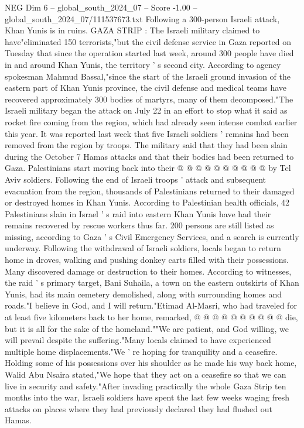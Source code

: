 \begin{textsample}{NEG Dim 6 – global\_south\_2024\_07 – Score -1.00 – global\_south\_2024\_07/111537673.txt}  \label{ex:f6_neg_132}
Following a 300-person Israeli attack, Khan Yunis is in ruins.
GAZA STRIP : The Israeli military claimed to have"eliminated 150 terrorists,"but the civil defense service in Gaza reported on Tuesday that since the operation started last week, around 300 people have died in and around Khan Yunis, the territory ' s second city.
According to agency spokesman Mahmud Bassal,"since the start of the Israeli ground invasion of the eastern part of Khan Yunis province, the civil defense and medical teams have recovered approximately 300 bodies of martyrs, many of them decomposed."The Israeli military began the attack on July 22 in an effort to stop what it said as rocket fire coming from the region, which had already seen intense combat earlier this year.
It was reported last week that five Israeli soldiers ' remains had been removed from the region by troops.
The military said that they had been slain during the October 7 Hamas attacks and that their bodies had been returned to Gaza.
Palestinians start moving back into their @ @ @ @ @ @ @ @ @ @ by Tel Aviv soldiers.
Following the end of Israeli troops ' attack and subsequent evacuation from the region, thousands of Palestinians returned to their damaged or destroyed homes in Khan Yunis.
According to Palestinian health officials, 42 Palestinians slain in Israel ' s raid into eastern Khan Yunis have had their remains recovered by rescue workers thus far. 200 persons are still listed as missing, according to Gaza ' s Civil Emergency Services, and a search is currently underway.
Following the withdrawal of Israeli soldiers, locals began to return home in droves, walking and pushing donkey carts filled with their possessions.
Many discovered damage or destruction to their homes.
According to witnesses, the raid ' s primary target, Bani Suhaila, a town on the eastern outskirts of Khan Yunis, had its main cemetery demolished, along with surrounding homes and roads."I believe in God, and I will return."Etimad Al-Masri, who had traveled for at least five kilometers back to her home, remarked, @ @ @ @ @ @ @ @ @ @ die, but it is all for the sake of the homeland.""We are patient, and God willing, we will prevail despite the suffering."Many locals claimed to have experienced multiple home displacements."We ' re hoping for tranquility and a ceasefire.
Holding some of his possessions over his shoulder as he made his way back home, Walid Abu Nsaira stated,"We hope that they act on a ceasefire so that we can live in security and safety."After invading practically the whole Gaza Strip ten months into the war, Israeli soldiers have spent the last few weeks waging fresh attacks on places where they had previously declared they had flushed out Hamas.

\end{textsample}
